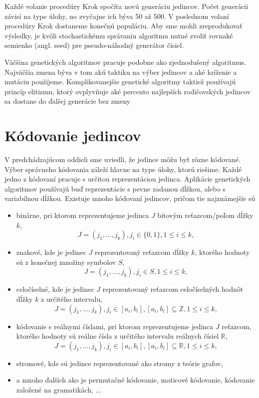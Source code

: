 Každé volanie procedúry Krok spočíta novú generáciu jedincov. Počet generácii závisí na type úlohy, no zvyčajne ich býva 50 až 500. V poslednom volaní procedúry Krok dostaneme konečnú populáciu. Aby sme mohli zreprodukovať výsledky, je kvôli stochastickému správaniu algoritmu nutné zvoliť rovnaké semienko (angl. seed) pre pseudo-náhodný generátor čísiel.

Väčšina genetických algoritmov pracuje podobne ako zjednodušený algoritmus. Najväčšia zmena býva v tom akú taktiku na výber jedincov a aké kríženie a mutáciu použijeme. Komplikovanejšie genetické algoritmy taktiež používajú princíp elitizmu, ktorý ovplyvňuje aké percento najlepších rodičovských jedincov sa dostane do ďalšej generácie bez zmeny

\section{Kódovanie jedincov}\label{kap2:2.2:Coding}
V predchádzajúcom oddieli sme uviedli, že jedince môžu byť rôzne kódované. Výber správneho kódovania záleží hlavne na type úlohy, ktorú riešime. Každé jedno z kódovaní pracuje s určitou reprezentáciou jedinca. Aplikácie genetických algoritmov používajú buď reprezentácie s pevne zadanou dĺžkou, alebo s variabilnou dĺžkou. Existuje mnoho kódovaní jedincov, pričom tie najznámejšie sú
\begin{itemize}
\item binárne, pri ktorom reprezentujeme jedinca $J$ bitovým reťazcom/poľom dĺžky $k$,
\begin{equation}
J = (j_1,\ldots,j_k), j_i \in \{0,1\}, 1 \leq i \leq k, \nonumber
\end{equation}
\item znakové, kde je jedinec $J$ reprezentovaný reťazcom dĺžky $k$, ktorého hodnoty sú z konečnej množiny symbolov $S$,
\begin{equation}
J = (j_1,\ldots,j_k), j_i \in S, 1 \leq i \leq k, \nonumber
\end{equation}
\item celočíselné, kde je jedinec $J$ reprezentovaný reťazcom celočíselných hodnôt dĺžky $k$ z určitého intervalu,
\begin{equation}
J = (j_1,\ldots,j_k), j_i \in [a_i,b_i], [a_i,b_i] \subseteq \mathbb{Z}, 1 \leq i \leq k, \nonumber
\end{equation}
\item kódovanie s reálnymi číslami, pri ktorom reprezentujeme jedinca $J$ reťazcom, ktorého hodnoty sú reálne čísla z určitého intervalu reálnych čísiel $\mathbb{R}$,
\begin{equation}
J = (j_1,\ldots,j_k), j_i \in [a_i,b_i], [a_i,b_i] \subseteq \mathbb{R}, 1 \leq i \leq k, \nonumber
\end{equation}
\item stromové, kde sú jedince reprezentované ako stromy z teórie grafov,
\item a mnoho ďalších ako je permutačné kódovanie, maticové kódovanie, kódovanie založené na gramatikách, ...
\end{itemize} 


